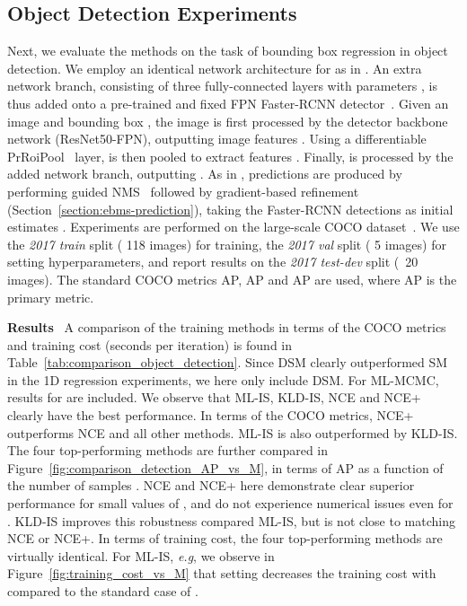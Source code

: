 \documentclass{bmvc2k}
\def\eg{\emph{e.g}\bmvaOneDot}
\newcommand{\parsection}[1]{\vspace{2mm}\noindent\textbf{#1}~ }
\begin{document}
\subsection{Object Detection Experiments}
\label{section:comparison-ObjectDetection}
Next, we evaluate the methods on the task of bounding box regression in object detection. We employ an identical network architecture for  as in \cite{gustafsson2019learning}. An extra network branch, consisting of three fully-connected layers with parameters , is thus added onto a pre-trained and fixed FPN Faster-RCNN detector~\cite{lin2017feature}. Given an image  and bounding box , the image is first processed by the detector backbone network (ResNet50-FPN), outputting image features . Using a differentiable PrRoiPool~\cite{jiang2018acquisition} layer,  is then pooled to extract features . Finally,  is processed by the added network branch, outputting . As in \cite{gustafsson2019learning}, predictions  are produced by performing guided NMS~\cite{jiang2018acquisition} followed by gradient-based refinement (Section~\ref{section:ebms-prediction}), taking the Faster-RCNN detections as initial estimates . Experiments are performed on the large-scale COCO dataset~\cite{lin2014microsoft}. We use the \textit{2017 train} split ( 118 images) for training, the \textit{2017 val} split ( 5 images) for setting hyperparameters, and report results on the \emph{2017 test-dev} split (~20 images). The standard COCO metrics AP, AP and AP are used, where AP is the primary metric.





\parsection{Results}
A comparison of the training methods in terms of the COCO metrics and training cost (seconds per iteration) is found in Table~\ref{tab:comparison_object_detection}. Since DSM clearly outperformed SM in the 1D regression experiments, we here only include DSM. For ML-MCMC, results for  are included. We observe that ML-IS, KLD-IS, NCE and NCE+ clearly have the best performance. In terms of the COCO metrics, NCE+ outperforms NCE and all other methods. ML-IS is also outperformed by KLD-IS. The four top-performing methods are further compared in Figure~\ref{fig:comparison_detection_AP_vs_M}, in terms of AP as a function of the number of samples . NCE and NCE+ here demonstrate clear superior performance for small values of , and do not experience numerical issues even for . KLD-IS improves this robustness compared ML-IS, but is not close to matching NCE or NCE+. In terms of training cost, the four top-performing methods are virtually identical. For ML-IS, \eg, we observe in Figure~\ref{fig:training_cost_vs_M} that setting  decreases the training cost with  compared to the standard case of . 
\end{document}
